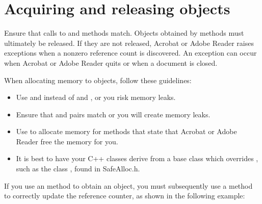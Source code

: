 \documentclass[letterpaper,12pt,english,openany,oneside]{sphinxmanual}
\begin{document}
\section{Acquiring and releasing objects}
\label{\detokenize{Plugins_Pimech:acquiring-and-releasing-objects}}
Ensure that calls to  and  methods match. Objects obtained by  methods must ultimately be released. If they are not released, Acrobat or Adobe Reader raises exceptions when a non\sphinxhyphen{}zero reference count is discovered. An exception can occur when Acrobat or Adobe Reader quits or when a document is closed.

When allocating memory to objects, follow these guidelines:
\begin{itemize}
\item {} 
Use  and  instead of  and , or you risk memory leaks.

\item {} 
Ensure that  and  pairs match or you will create memory leaks.

\item {} 
Use  to allocate memory for methods that state that Acrobat or Adobe Reader free the memory for you.

\item {} 
It is best to have your C++ classes derive from a base class which overrides , such as the class , found in SafeAlloc.h.

\end{itemize}

If you use an  method to obtain an object, you must subsequently use a  method to correctly update the reference counter, as shown in the following example:

\begin{sphinxVerbatim}[commandchars=\\\{\}]
 
 

      
    
   

     
  
 
\end{sphinxVerbatim}
\end{document}
